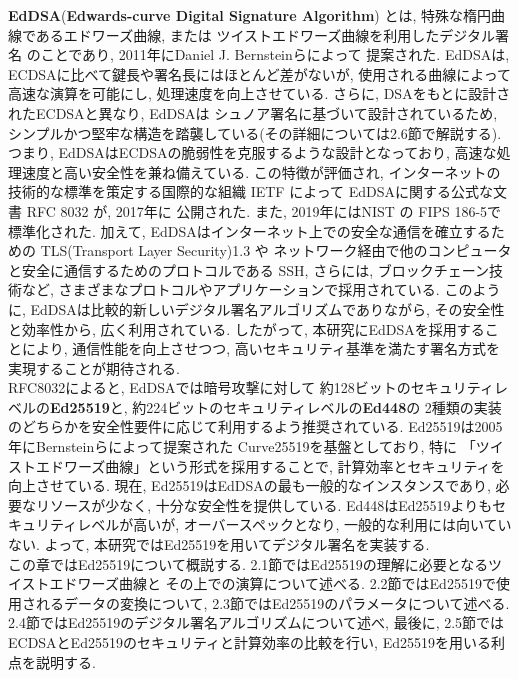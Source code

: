 \textbf{EdDSA}(\textbf{Edwards-curve Digital Signature Algorithm})
とは,  特殊な楕円曲線であるエドワーズ曲線, または
ツイストエドワーズ曲線\cite{twisted}を利用したデジタル署名
のことであり, 2011年にDaniel J. Bernsteinらによって
提案された\cite{high-speed}. 
EdDSAは, ECDSAに比べて鍵長や署名長にはほとんど差がないが, 
使用される曲線によって高速な演算を可能にし, 処理速度を向上させている. 
さらに, DSAをもとに設計されたECDSAと異なり, EdDSAは
シュノア署名\cite{schnorr}に基づいて設計されているため, 
シンプルかつ堅牢な構造を踏襲している(その詳細については2.6節で解説する). 
つまり, EdDSAはECDSAの脆弱性を克服するような設計となっており, 
高速な処理速度と高い安全性を兼ね備えている. この特徴が評価され, 
インターネットの技術的な標準を策定する国際的な組織 IETF によって
EdDSAに関する公式な文書 RFC 8032 \cite{8032}が, 2017年に
公開された. また, 2019年にはNIST の FIPS 186-5で標準化された. 
加えて, EdDSAはインターネット上での安全な通信を確立するための 
TLS(Transport Layer Security)1.3 \cite{rfc8446}や
ネットワーク経由で他のコンピュータと安全に通信するためのプロトコルである 
SSH, さらには, ブロックチェーン技術\cite{monero}など, 
さまざまなプロトコルやアプリケーションで採用されている. 
このように, EdDSAは比較的新しいデジタル署名アルゴリズムでありながら, 
その安全性と効率性から, 広く利用されている. 
したがって, 本研究にEdDSAを採用することにより, 通信性能を向上させつつ, 
高いセキュリティ基準を満たす署名方式を実現することが期待される.\\
\indent RFC8032によると, EdDSAでは暗号攻撃に対して
約128ビットのセキュリティレベルの\textbf{Ed25519}と, 
約224ビットのセキュリティレベルの\textbf{Ed448}の
2種類の実装のどちらかを安全性要件に応じて利用するよう推奨されている. 
Ed25519は2005年にBernsteinらによって提案された
Curve25519\cite{curve25519}を基盤としており, 特に
「ツイストエドワーズ曲線」という形式を採用することで, 
計算効率とセキュリティを向上させている. 
現在, Ed25519はEdDSAの最も一般的なインスタンスであり, 
必要なリソースが少なく, 十分な安全性を提供している. 
Ed448はEd25519よりもセキュリティレベルが高いが, 
オーバースペックとなり, 一般的な利用には向いていない. 
よって, 本研究ではEd25519を用いてデジタル署名を実装する.\\
\indent この章ではEd25519について概説する. 
2.1節ではEd25519の理解に必要となるツイストエドワーズ曲線と
その上での演算について述べる. 
2.2節ではEd25519で使用されるデータの変換について, 
2.3節ではEd25519のパラメータについて述べる. 
2.4節ではEd25519のデジタル署名アルゴリズムについて述べ, 
最後に, 2.5節ではECDSAとEd25519のセキュリティと計算効率の比較を行い, 
Ed25519を用いる利点を説明する.\\
